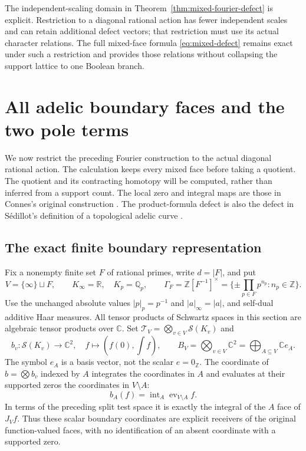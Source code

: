 \documentclass[11pt,a4paper]{article}
\theoremstyle{definition}\newtheorem{definition}[theorem]{Definition}
\newcommand{\Z}{\mathbb Z}\newcommand{\Q}{\mathbb Q}
\newcommand{\C}{\mathbb C}\newcommand{\R}{\mathbb R}
\newcommand{\Sch}{\mathcal S}\newcommand{\im}{\operatorname{im}}
\begin{document}
The independent-scaling domain in Theorem~\ref{thm:mixed-fourier-defect} is explicit. Restriction to a diagonal rational action has fewer independent scales and can retain additional defect vectors; that restriction must use its actual character relations. The full mixed-face formula \eqref{eq:mixed-defect} remains exact under such a restriction and provides those relations without collapsing the support lattice to one Boolean branch.

\section{All adelic boundary faces and the two pole terms}
\label{sec:adelic-boundary}
We now restrict the preceding Fourier construction to the actual diagonal
rational action. The calculation keeps every mixed face before taking a
quotient. The quotient and its contracting homotopy will be computed, rather
than inferred from a support count. The local zero and integral maps are those
in Connes's original construction \cite[Section III, (6)--(11)]{Connes1998}.
The product-formula defect is also the defect in S\'edillot's definition of a
topological adelic curve \cite[\texttt{def:topological\_adelic\_curve}]{Sedillot}.

\subsection{The exact finite boundary representation}
Fix a nonempty finite set $F$ of rational primes, write $d=|F|$, and put
\[
 V=\{\infty\}\sqcup F,\qquad K_\infty=\R,\quad K_p=\Q_p,
 \qquad \Gamma_F=\Z[F^{-1}]^\times
 =\{\pm\prod_{p\in F}p^{n_p}:n_p\in\Z\}.
 \tag{AB1}
\]
Use the unchanged absolute values $|p|_p=p^{-1}$ and $|a|_\infty=|a|$,
and self-dual additive Haar measures. All tensor products of Schwartz spaces
in this section are algebraic tensor products over $\C$.
Set $\mathcal T_V=\bigotimes_{v\in V}\Sch(K_v)$ and
\[
 b_v:\Sch(K_v)\longrightarrow\C^2,\quad
 f\longmapsto(f(0),\int f),\qquad
 B_V=\bigotimes_{v\in V}\C^2=\bigoplus_{A\subseteq V}\C e_A.
 \tag{AB2}
\]
The symbol $e_A$ is a basis vector, not the scalar $e=0_\Z$.
The coordinate of $b=\bigotimes b_v$ indexed by $A$ integrates the coordinates
in $A$ and evaluates at their supported zeros the coordinates in $V\setminus A$:
\[
 b_A(f)=\operatorname{int}_A\operatorname{ev}_{V\setminus A}f.
 \tag{AB3}
\]
In terms of the preceding split test space it is exactly the integral of the
$A$ face of $J_Vf$. Thus these scalar boundary coordinates are explicit
receivers of the original function-valued faces, with no identification of
an absent coordinate with a supported zero.
\end{document}

